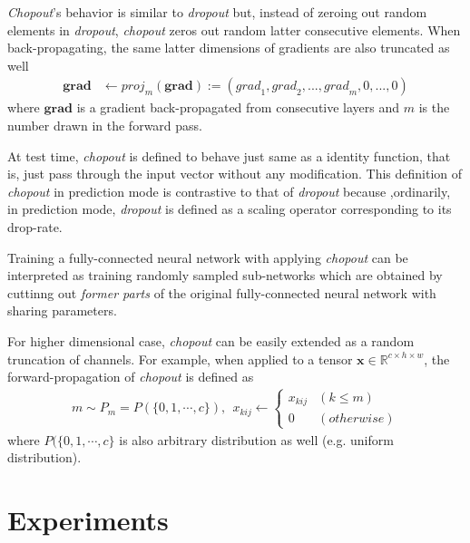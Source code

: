 \documentclass{article}
\begin{document}
    \textit{Chopout}'s behavior is similar to \textit{dropout} but, instead of zeroing out random elements in \textit{dropout}, \textit{chopout} zeros out random latter consecutive elements. When back-propagating, the same latter dimensions of gradients are also truncated as well
    \begin{align}
        \mathbf{grad} &\leftarrow {proj}_m(\mathbf{grad}) := ({grad}_1, {grad}_2, ..., {grad}_m, 0, ..., 0) \nonumber
    \end{align}    
    where $\mathbf{grad}$ is a gradient back-propagated from consecutive layers and $m$ is the number drawn in the forward pass. 
    
    At test time, \textit{chopout} is defined to behave just same as a identity function, that is, just pass through the input vector without any modification. This definition of \textit{chopout} in prediction mode is contrastive to that of \textit{dropout} because ,ordinarily, in prediction mode, \textit{dropout} is defined as a scaling operator corresponding to its drop-rate.
    
    Training a fully-connected neural network with applying \textit{chopout} can be interpreted as training randomly sampled sub-networks which are obtained by cuttinng out \textit{former parts} of the original fully-connected neural network with sharing parameters.

    For higher dimensional case, \textit{chopout} can be easily extended as a random truncation of channels.  For example, when applied to a tensor $\mathbf{x} \in \mathbb{R}^{c \times h \times w}$, the forward-propagation of \textit{chopout} is defined as
    \begin{align}
        m \sim P_m = P(\{0, 1, \cdots, c\}), \ \ 
        x_{kij} \leftarrow \begin{cases}
            x_{kij} & (k \leq m) \\
            0 & (otherwise)
            \end{cases} \nonumber
    \end{align}
    where $P(\{0, 1, \cdots, c\}$ is also arbitrary distribution as well (e.g. uniform distribution). 

    \section{Experiments}
    \label{experiments}
    
\end{document}
